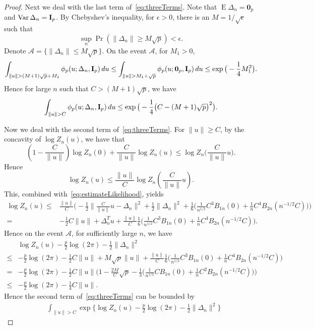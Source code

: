 \documentclass[11pt, letterpaper]{article}
\DeclareMathOperator{\myE}{E}
\DeclareMathOperator{\myVar}{Var}
\theoremstyle{plain}
\theoremstyle{definition}
\theoremstyle{remark}
\begin{document}
\begin{proof}
    Next we deal with the last term of~\eqref{eq:threeTerms}.
Note that $\myE \Delta_n=\textbf{0}_p$ and $\myVar \Delta_n = \BI_p$. By Chebyshev's inequality, for $\epsilon>0$, there is an $M=1/\sqrt{\epsilon}$ such that $$\sup_n\Pr(\|\Delta_n\|\geq M\sqrt{p})<\epsilon.$$
Denote $\mathcal{A}=\{\|\Delta_n\|\leq M\sqrt{p}\}$.
On the event $\mathcal{A}$, for $M_1>0$,
$$
\int_{\|u\|>(M+1)\sqrt{p}+M_1} \phi_p(u;\Delta_n,\BI_p)\, du\leq \int_{\|u\|>M_1+\sqrt{p}} \phi_p(u;\mathbf{0}_p,\BI_p)\, du\leq \exp \big(-\frac{1}{4}M_1^2 \big).
$$
Hence for large $n$ such that $C>(M+1)\sqrt{p}$, we have
$$
\int_{\|u\|>C} \phi_p(u;\Delta_n,\BI_p)\, du\leq \exp \big(-\frac{1}{4}\big(C-(M+1)\sqrt{p}\big)^2 \big).
$$

Now we deal with the second term of~\eqref{eq:threeTerms}.
For $\|u\|\geq C$, by the concavity of $\log Z_n(u)$, we have that
$$
(1-\frac{C}{\|u\|})\log Z_n(0)+\frac{C}{\|u\|}\log Z_n(u)
\leq 
\log Z_n\big(\frac{C}{\|u\|}u\big).
$$
Hence 
$$\log Z_n(u)\leq \frac{\|u\|}{C} \log Z_n(\frac{C}{\|u\|} u).$$
This, combined with~\eqref{eq:estimateLikelihood}, yields
$$
\begin{aligned}
    \log Z_n(u)\leq& 
    \frac{\|u\|}{C}\Big(
    -\frac{1}{2}\big\|\frac{C}{\|u\|}u-\Delta_n \big\|^2+\frac{1}{2}\|\Delta_n\|^2+
    \frac{1}{6}\big(\frac{1}{n^{1/2}}C^3 B_{1n}(0)+\frac{1}{n}C^4 B_{2n}(n^{-1/2}C)\big)
    \Big)\\
    =&
    -\frac{1}{2} C\|u\|+ \Delta_n^T u
    +\frac{\|u\|}{C}\frac{1}{6}\big(\frac{1}{n^{1/2}}C^3 B_{1n}(0)+\frac{1}{n}C^4 B_{2n}(n^{-1/2}C)\big).
\end{aligned}
$$
Hence on the event $\mathcal{A}$, for sufficiently large $n$, we have
$$
\begin{aligned}
    &\log Z_n(u) -\frac{p}{2}\log (2\pi)-\frac{1}{2}\|\Delta_n\|^2\\
    \leq&
-\frac{p}{2}\log (2\pi)
    -\frac{1}{2} C\|u\|+ M\sqrt{p} \| u\|
    +\frac{\|u\|}{C}\frac{1}{6}\big(\frac{1}{n^{1/2}}C^3 B_{1n}(0)+\frac{1}{n}C^4 B_{2n}(n^{-1/2}C)\big)\\
    =&
-\frac{p}{2}\log (2\pi)
    -\frac{1}{2} C\|u\|\Big(1- \frac{2M}{C}\sqrt{p} 
    -\frac{1}{3}\big(\frac{1}{n^{1/2}}C B_{1n}(0)+\frac{1}{n}C^2 B_{2n}(n^{-1/2}C)\big)\Big)\\
    \leq&
-\frac{p}{2}\log (2\pi)
    -\frac{1}{4} C\|u\|.
\end{aligned}
$$
Hence the second term of~\eqref{eq:threeTerms} can be bounded by
$$
\begin{aligned}
    &\int_{\|u\|> C}
\exp\big\{\log Z_n(u) -\frac{p}{2}\log (2\pi)-\frac{1}{2}\|\Delta_n\|^2\big\}

\end{aligned}$$
\end{proof}
\end{document}

